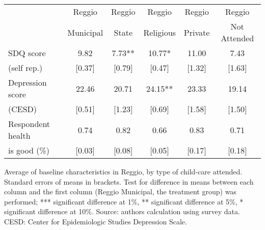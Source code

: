 \centering
\begin{adjustbox}{width=0.9\textwidth,center=\textwidth}
\small
\begin{tabular}{m{4.0cm} ccccc}
\hline \hline 
 & Reggio & Reggio & Reggio & Reggio & Reggio \\
 & Municipal & State & Religious & Private & Not Attended  \\

\hline 
SDQ score & 9.82 & 7.73** & 10.77* & 11.00 & 7.43 \\ 
(self rep.)  & [0.37] & [0.79] & [0.47] & [1.32] & [1.63] \\
Depression score & 22.46 & 20.71 & 24.15** & 23.33 & 19.14 \\ 
(CESD)  & [0.51] & [1.23] & [0.69] & [1.58] & [1.50] \\ 
Respondent health & 0.74 & 0.82 & 0.66 & 0.83 & 0.71 \\ 
is good (\%)  & [0.03] & [0.08] & [0.05] & [0.17] & [0.18] \\
\hline 
\end{tabular}

\end{adjustbox}
\raggedright{
\footnotesize{Average of baseline characteristics in Reggio, by type of child-care attended. Standard errors of means in brackets. Test for difference in means between each column and the first column (Reggio Municipal, the treatment group) was performed; *** significant difference at 1\%, ** significant difference at 5\%, * significant difference at 10\%. Source: authors calculation using survey data. CESD: Center for Epidemiologic Studies Depression Scale.}
}


